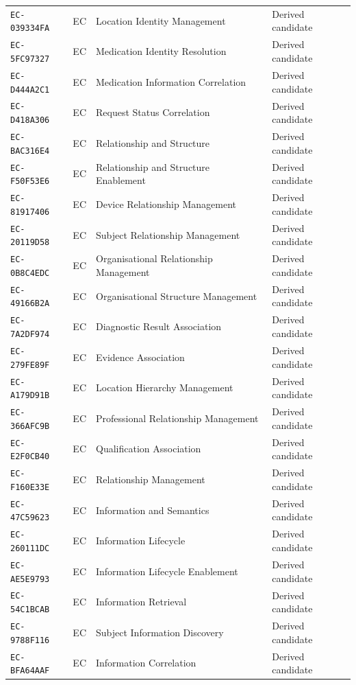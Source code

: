 \documentclass[11pt,a4paper,openany]{book}
\begin{document}
\begin{longtable}{@{}p{.19\linewidth}p{.12\linewidth}p{.39\linewidth}p{.24\linewidth}@{}}
\texttt{EC-039334FA} & EC & Location Identity Management & Derived candidate \\
\texttt{EC-5FC97327} & EC & Medication Identity Resolution & Derived candidate \\
\texttt{EC-D444A2C1} & EC & Medication Information Correlation & Derived candidate \\
\texttt{EC-D418A306} & EC & Request Status Correlation & Derived candidate \\
\texttt{EC-BAC316E4} & EC & Relationship and Structure & Derived candidate \\
\texttt{EC-F50F53E6} & EC & Relationship and Structure Enablement & Derived candidate \\
\texttt{EC-81917406} & EC & Device Relationship Management & Derived candidate \\
\texttt{EC-20119D58} & EC & Subject Relationship Management & Derived candidate \\
\texttt{EC-0B8C4EDC} & EC & Organisational Relationship Management & Derived candidate \\
\texttt{EC-49166B2A} & EC & Organisational Structure Management & Derived candidate \\
\texttt{EC-7A2DF974} & EC & Diagnostic Result Association & Derived candidate \\
\texttt{EC-279FE89F} & EC & Evidence Association & Derived candidate \\
\texttt{EC-A179D91B} & EC & Location Hierarchy Management & Derived candidate \\
\texttt{EC-366AFC9B} & EC & Professional Relationship Management & Derived candidate \\
\texttt{EC-E2F0CB40} & EC & Qualification Association & Derived candidate \\
\texttt{EC-F160E33E} & EC & Relationship Management & Derived candidate \\
\texttt{EC-47C59623} & EC & Information and Semantics & Derived candidate \\
\texttt{EC-260111DC} & EC & Information Lifecycle & Derived candidate \\
\texttt{EC-AE5E9793} & EC & Information Lifecycle Enablement & Derived candidate \\
\texttt{EC-54C1BCAB} & EC & Information Retrieval & Derived candidate \\
\texttt{EC-9788F116} & EC & Subject Information Discovery & Derived candidate \\
\texttt{EC-BFA64AAF} & EC & Information Correlation & Derived candidate \\

\end{longtable}
\end{document}
